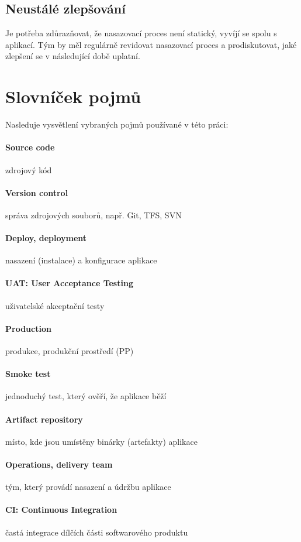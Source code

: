 \subsection{Neustálé zlepšování}
Je potřeba zdůrazňovat, že nasazovací proces není statický, vyvíjí se spolu s aplikací. Tým by měl regulárně revidovat nasazovací proces a prodiskutovat, jaké zlepšení se v následující době uplatní.

\section{Slovníček pojmů}
Nasleduje vysvětlení vybraných pojmů používané v této práci:

\paragraph{Source code} zdrojový kód
\paragraph{Version control} správa zdrojových souborů, např. Git, TFS, SVN
\paragraph{Deploy, deployment} nasazení (instalace) a konfigurace aplikace
\paragraph{UAT: User Acceptance Testing} uživatelské akceptační testy
\paragraph{Production} produkce, produkční prostředí (PP)
\paragraph{Smoke test} jednoduchý test, který ověří, že aplikace běží
\paragraph{Artifact repository} místo, kde jsou umístěny binárky (artefakty) aplikace
\paragraph{Operations, delivery team} tým, který provádí nasazení a údržbu aplikace
\paragraph{CI: Continuous Integration} častá integrace dílčích části softwarového produktu
